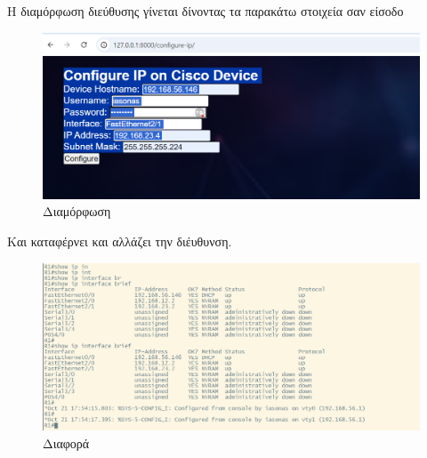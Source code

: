Η διαμόρφωση  διεύθυσης γίνεται δίνοντας τα παρακάτω στοιχεία
σαν είσοδο

\FloatBarrier

\begin{figure}[h]
	\centering
	\includegraphics[width=1.0\textwidth]{graphics/configure_ip.png}
	\caption{Διαμόρφωση}
\end{figure}

Και καταφέρνει και αλλάζει την διέυθυνση.

\FloatBarrier

\begin{figure}[h]
	\centering
	\includegraphics[width=1.0\textwidth]{graphics/configure_ip_1.png}
	\caption{ Διαφορά}
\end{figure}